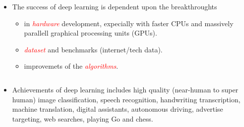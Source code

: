 \documentclass[10pt,ignorenonframetext,]{beamer}
\providecommand{\tightlist}{%
  \setlength{\itemsep}{0pt}\setlength{\parskip}{0pt}}
\begin{document}
\begin{frame}

\begin{itemize}
\tightlist
\item
  The success of deep learning is dependent upon the breakthroughts

  \begin{itemize}
  \tightlist
  \item
    in \emph{\textcolor{red}{hardware}} development, expecially with
    faster CPUs and massively parallell graphical processing units
    (GPUs).
  \item
    \emph{\textcolor{red}{dataset}} and benchmarks (internet/tech data).
  \item
    improvemets of the \emph{\textcolor{red}{algorithms}}.
  \end{itemize}
\end{itemize}

\(~\)

\begin{itemize}
\tightlist
\item
  Achievements of deep learning includes high quality (near-human to
  super human) image classification, speech recognition, handwriting
  transcription, machine translation, digital assistants, autonomous
  driving, advertise targeting, web searches, playing Go and chess.
\end{itemize}

\end{frame}
\end{document}
